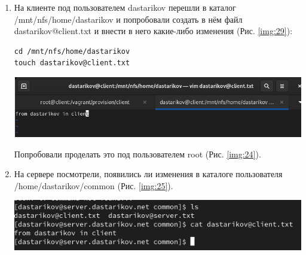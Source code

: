 \begin{enumerate}
\item На клиенте под пользователем dastarikov перешли в каталог /mnt/nfs/home/dastarikov и попробовали создать в нём файл dastarikov@client.txt и внести в него какие-либо изменения (Рис. \ref{img:29}):
    \begin{verbatim}
cd /mnt/nfs/home/dastarikov
touch dastarikov@client.txt
    \end{verbatim}

\begin{center}
    \centering
    \includegraphics[width=\textwidth]{../images/image29.png}
    \label{img:29}
\end{center}

Попробовали проделать это под пользователем root (Рис. \ref{img:24}).

\item На сервере посмотрели, появились ли изменения в каталоге пользователя /home/dastarikov/common (Рис. \ref{img:25}).

\begin{center}
    \centering
    \includegraphics[width=\textwidth]{../images/image25.png}
    \label{img:25}
\end{center}

\end{enumerate}

